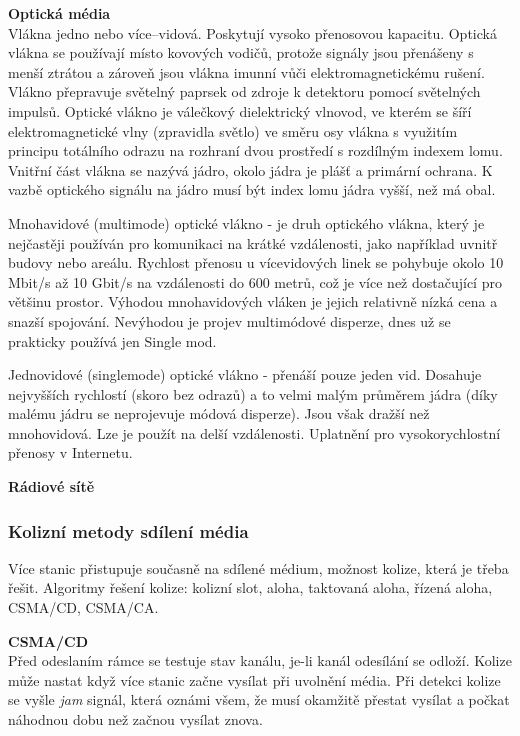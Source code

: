 \textbf{Optická média}\\
Vlákna jedno nebo více--vidová. Poskytují vysoko přenosovou kapacitu. Optická vlákna se používají místo kovových vodičů, protože signály jsou přenášeny s menší ztrátou a zároveň jsou vlákna imunní vůči elektromagnetickému rušení. Vlákno přepravuje světelný paprsek od zdroje k detektoru pomocí světelných impulsů. Optické vlákno je válečkový dielektrický vlnovod, ve kterém se šíří elektromagnetické vlny (zpravidla světlo) ve směru osy vlákna s využitím principu totálního odrazu na rozhraní dvou prostředí s rozdílným indexem lomu. Vnitřní část vlákna se nazývá jádro, okolo jádra je plášť a primární ochrana. K vazbě optického signálu na jádro musí být index lomu jádra vyšší, než má obal.

Mnohavidové (multimode) optické vlákno - je druh optického vlákna, který je nejčastěji používán pro komunikaci na krátké vzdálenosti, jako například uvnitř budovy nebo areálu. Rychlost přenosu u vícevidových linek se pohybuje okolo 10 Mbit/s až 10 Gbit/s na vzdálenosti do 600 metrů, což je více než dostačující pro většinu prostor. Výhodou mnohavidových vláken je jejich relativně nízká cena a snazší spojování. Nevýhodou je projev multimódové disperze, dnes už se prakticky používá jen Single mod.

Jednovidové (singlemode) optické vlákno - přenáší pouze jeden vid. Dosahuje nejvyšších rychlostí (skoro bez odrazů) a to velmi malým průměrem jádra (díky malému jádru se neprojevuje módová disperze). Jsou však dražší než mnohovidová. Lze je použít na delší vzdálenosti. Uplatnění pro vysokorychlostní přenosy v Internetu.

\textbf{Rádiové sítě}\\

\subsubsection{Kolizní metody sdílení média}
Více stanic přistupuje současně na sdílené médium, možnost kolize, která je třeba řešit. Algoritmy řešení kolize: kolizní slot, aloha, taktovaná aloha,
řízená aloha, CSMA/CD, CSMA/CA.

\textbf{CSMA/CD}\\
Před odeslaním rámce se testuje stav kanálu, je-li kanál odesílání se odloží. Kolize může nastat když více stanic začne vysílat při uvolnění média. Při detekci kolize se vyšle \textit{jam} signál, která oznámi všem, že musí okamžitě přestat vysílat a počkat náhodnou dobu než začnou vysílat znova.

